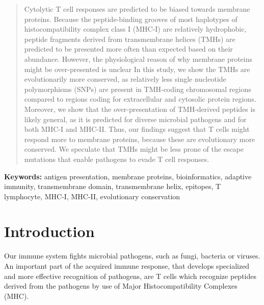 \begin{abstract}

Cytolytic T cell responses are predicted to be biased towards membrane proteins. 
Because the peptide-binding grooves of most haplotypes 
of histocompatibility complex class I (MHC-I) are relatively hydrophobic, 
peptide fragments derived from transmembrane helices (TMHs) 
are predicted to be presented more often than expected based on their abundance.
However, the physiological reason of why membrane proteins might be 
over-presented is unclear
In this study, we show the TMHs are evolutionarily more conserved, 
as relatively less single nucleotide polymorphisms (SNPs) 
are present in TMH-coding chromosomal regions 
compared to regions coding for extracellular and cytosolic protein regions. 
Moreover, we show that the over-presentation of TMH-derived peptides is 
likely general, as it is predicted for diverse microbial pathogens 
and for both MHC-I and MHC-II.
Thus, our findings suggest that T cells might respond 
more to membrane proteins, because these are evolutionary more conserved.
We speculate that TMHs might be less prone of the escape mutations 
that enable pathogens to evade T cell responses.

\end{abstract}

{\bf Keywords:} antigen presentation, membrane proteins, bioinformatics, 
adaptive immunity, transmembrane domain, transmembrane helix, 
epitopes, T lymphocyte, MHC-I, MHC-II, evolutionary conservation

\section{Introduction}


Our immune system fights microbial pathogens, 
such as fungi, bacteria or viruses. 
An important part of the acquired immune response, 
that develops specialized and more effective recognition of pathogens, 
are T cells which recognize peptides derived from the pathogens 
by use of Major Histocompatibility Complexes (MHC). 


